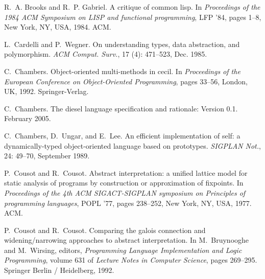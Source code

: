 \documentclass[9pt]{sigplanconf}
\begin{document}
\begin{thebibliography}{27}
R.~A. Brooks and R.~P. Gabriel.
\newblock A critique of common lisp.
\newblock In \emph{Proceedings of the 1984 ACM Symposium on LISP and functional
  programming}, LFP '84, pages 1--8, New York, NY, USA, 1984. ACM.

L.~Cardelli and P.~Wegner.
\newblock On understanding types, data abstraction, and polymorphism.
\newblock \emph{ACM Comput. Surv.}, 17 (4): 471--523, Dec.
  1985.

C.~Chambers.
\newblock Object-oriented multi-methods in cecil.
\newblock In \emph{Proceedings of the European Conference on Object-Oriented
  Programming}, pages 33--56, London, UK, 1992. Springer-Verlag.

C.~Chambers.
\newblock The diesel language specification and rationale: Version 0.1.
\newblock February 2005.

C.~Chambers, D.~Ungar, and E.~Lee.
\newblock An efficient implementation of self: a dynamically-typed
  object-oriented language based on prototypes.
\newblock \emph{SIGPLAN Not.}, 24: 49--70, September 1989.

P.~Cousot and R.~Cousot.
\newblock Abstract interpretation: a unified lattice model for static analysis
  of programs by construction or approximation of fixpoints.
\newblock In \emph{Proceedings of the 4th ACM SIGACT-SIGPLAN symposium on
  Principles of programming languages}, POPL '77, pages 238--252, New York, NY,
  USA, 1977. ACM.

P.~Cousot and R.~Cousot.
\newblock Comparing the galois connection and widening/narrowing approaches to
  abstract interpretation.
\newblock In M.~Bruynooghe and M.~Wirsing, editors, \emph{Programming Language
  Implementation and Logic Programming}, volume 631 of \emph{Lecture Notes in
  Computer Science}, pages 269--295. Springer Berlin / Heidelberg, 1992.


\end{thebibliography}
\end{document}
